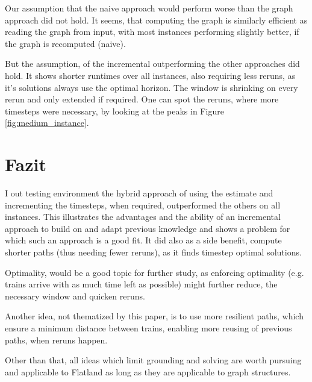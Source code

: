 Our assumption that the naive approach would perform worse than the graph approach did not hold. It seems, that computing the graph is similarly efficient as reading the graph from input, with most instances performing slightly better, if the graph is recomputed (naive).

But the assumption, of the incremental outperforming the other approaches did hold. It shows shorter runtimes over all instances, also requiring less reruns, as it's solutions always use the optimal horizon. The window is shrinking on every rerun and only extended if required. One can spot the reruns, where more timesteps were necessary, by looking at the peaks in Figure \ref{fig:medium_instance}.

\section{Fazit}
I out testing environment the hybrid approach of using the estimate and incrementing the timesteps, when required, outperformed the others on all instances. This illustrates the advantages and the ability of an incremental approach to build on and adapt previous knowledge and shows a problem for which such an approach is a good fit. It did also as a side benefit, compute shorter paths (thus needing fewer reruns), as it finds timestep optimal solutions.

Optimality, would be a good topic for further study, as enforcing optimality (e.g. trains arrive with as much time left as possible) might further reduce, the necessary window and quicken reruns.

Another idea, not thematized by this paper, is to use more resilient paths, which ensure a minimum distance between trains, enabling more reusing of previous paths, when reruns happen.  

Other than that, all ideas which limit grounding and solving are worth pursuing and applicable to Flatland as long as they are applicable to graph structures.
